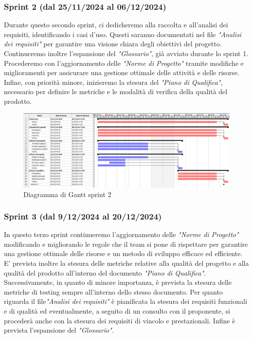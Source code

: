         \subsubsection{Sprint 2 (dal 25/11/2024 al 06/12/2024)}
        Durante questo secondo sprint, ci dedicheremo alla raccolta e all'analisi dei requisiti, identificando i 
        casi d'uso. Questi saranno documentati nel file \textit{"Analisi dei requisiti"} per garantire una visione 
        chiara degli obiettivi del progetto. Continueremo inoltre l'espansione del \textit{"Glossario"}, già 
        avviato durante lo sprint 1.  Procederemo con l'aggiornamento delle \textit{"Norme di Progetto"} tramite modifiche e miglioramenti per assicurare una gestione ottimale delle attività e delle risorse. Infine, con priorità minore, inizieremo la stesura del \textit{"Piano di Qualifica"}, necessario per definire le metriche e le modalità di 
        verifica della qualità del prodotto.

        
        \begin{figure}[h!]
            \centering
            \includegraphics[scale = 0.3]{template/images/gantt2.png}
            \caption{Diagramma di Gantt sprint 2}
            \label{fig:3.2} %
        \end{figure}


        \subsubsection{Sprint 3 (dal 9/12/2024 al 20/12/2024)}
        In questo terzo sprint continueremo l'aggiornamento delle \textit{"Norme di Progetto"} modificando e migliorando le regole che il team si pone di rispettare per garantire
        una gestione ottimale delle risorse e un metodo di sviluppo efficace ed efficiente. E' prevista inoltre la stesura delle metriche relative alla qualità del progetto e alla qualità del prodotto all'interno del documento \textit{"Piano di Qualifica"}.
        Successivamente, in quanto di minore importanza, è prevista la stesura delle metriche di testing sempre all'interno dello stesso documento.
        Per quanto riguarda il file\textit{"Analisi dei requisiti"} è pianificata la stesura dei requisiti funzionali e di qualità ed eventualmente, a seguito di un consulto con il proponente, si procederà anche con la stesura dei requisiti di vincolo e prestazionali.
        Infine è prevista l'espansione del \textit{"Glossario"}.

